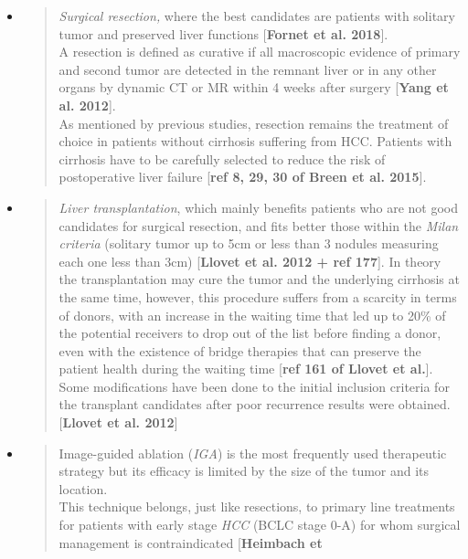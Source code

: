 \documentclass[]{article}
\begin{document}
\begin{itemize}
\item
  \begin{quote}
  \emph{Surgical resection,} where the best candidates are patients with
  solitary tumor and preserved liver functions {[}\textbf{Fornet et al.
  2018}{]}.\\
  A resection is defined as curative if all macroscopic evidence of
  primary and second tumor are detected in the remnant liver or in any
  other organs by dynamic CT or MR within 4 weeks after surgery
  {[}\textbf{Yang et al. 2012}{]}.\\
  As mentioned by previous studies, resection remains the treatment of
  choice in patients without cirrhosis suffering from HCC. Patients with
  cirrhosis have to be carefully selected to reduce the risk of
  postoperative liver failure {[}\textbf{ref 8, 29, 30 of Breen et al.
  2015}{]}.
  \end{quote}
\item
  \begin{quote}
  \emph{Liver transplantation}, which mainly benefits patients who are
  not good candidates for surgical resection, and fits better those
  within the \emph{Milan criteria} (solitary tumor up to 5cm or less
  than 3 nodules measuring each one less than 3cm) {[}\textbf{Llovet et
  al. 2012 + ref 177}{]}. In theory the transplantation may cure the
  tumor and the underlying cirrhosis at the same time, however, this
  procedure suffers from a scarcity in terms of donors, with an increase
  in the waiting time that led up to 20\% of the potential receivers to
  drop out of the list before finding a donor, even with the existence
  of bridge therapies that can preserve the patient health during the
  waiting time {[}\textbf{ref 161 of Llovet et al.}{]}.\\
  Some modifications have been done to the initial inclusion criteria
  for the transplant candidates after poor recurrence results were
  obtained. {[}\textbf{Llovet et al. 2012}{]}
  \end{quote}
\item
  \begin{quote}
  Image-guided ablation (\emph{IGA}) is the most frequently used
  therapeutic strategy but its efficacy is limited by the size of the
  tumor and its location.\\
  This technique belongs, just like resections, to primary line
  treatments for patients with early stage \emph{HCC} (BCLC stage 0-A)
  for whom surgical management is contraindicated {[}\textbf{Heimbach et
}
\end{quote}
\end{itemize}
\end{document}
